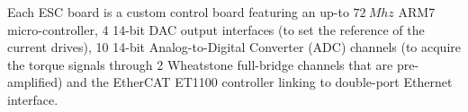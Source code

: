Each ESC board is a custom control board featuring an up-to $72 \ Mhz$ ARM7 micro-controller, 4 14-bit DAC output interfaces (to set the reference of the current drives), 10 14-bit Analog-to-Digital Converter (ADC) channels (to acquire the torque signals through 2 Wheatstone full-bridge channels that are pre-amplified) and the EtherCAT ET1100 controller linking to double-port Ethernet interface.
